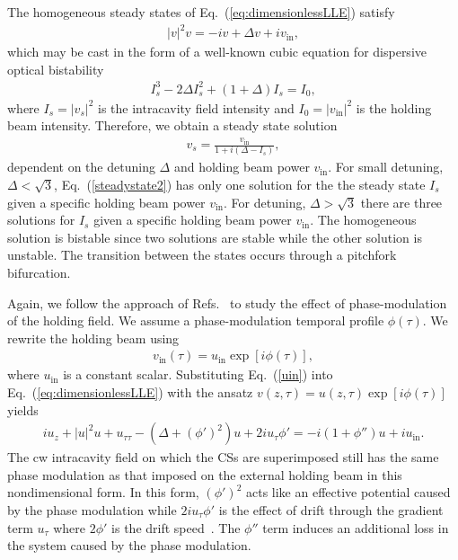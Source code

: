 The homogeneous steady states of Eq.~(\ref{eq:dimensionlessLLE}) satisfy 
\begin{align}
|v|^2 v = -i v + \Delta v+ i v_{\mathrm{in}}, 
\label{steadyStateNLS}
\end{align}
which may be cast in the form of a well-known cubic equation for dispersive optical bistability~\cite{Grelu,LL,info2,Gomila2007}
\begin{align}
I_s^3 - 2\Delta I_s^2 + (1+ \Delta) I_s = I_0,
\label{steadystate2}
\end{align}
where $I_s = |v_s|^2$ is the intracavity field intensity and $I_0 = |v_{\mathrm{in}}|^2$ is the holding beam intensity.  Therefore, we obtain a steady state solution
\begin{align}
v_s = \frac{v_{\mathrm{in}}}{1+ i (\Delta - I_s)},
\end{align}
dependent on the detuning $\Delta$ and holding beam power $v_{\mathrm{in}}$.  For small detuning, $\Delta < \sqrt{3}$, Eq.~(\ref{steadystate2}) has only one solution for the the steady state $I_s$ given a specific holding beam power $v_{\mathrm{in}}$.  For detuning, $\Delta > \sqrt{3}$ there are three solutions for $I_s$ given a specific holding beam power $v_{\mathrm{in}}$.  The homogeneous solution is bistable since two solutions are stable while the other solution is unstable.  The transition between the states occurs through a pitchfork bifurcation.

Again, we follow the approach of Refs.~\cite{tweeze,firth96} to study the effect of phase-modulation of the holding field.  We assume a phase-modulation temporal profile $\phi(\tau)$.  We rewrite the holding beam using  
\begin{align}
v_{\mathrm{in}} (\tau) = u_{\mathrm{in}} \exp[i \phi(\tau)], \label{uin}
\end{align}
where $u_{\mathrm{in}}$ is a constant scalar.  Substituting Eq.~(\ref{uin}) into Eq.~(\ref{eq:dimensionlessLLE}) with the ansatz $v(z, \tau) = u(z, \tau) \exp[i \phi(\tau)]$ yields 
\begin{align}
i u_z + |u|^2 u + u_{\tau\tau} - (\Delta + (\phi')^2) u + 2i u_{\tau} \phi' = - i (1+\phi'') u + i u_{\mathrm{in}}.
\label{eq:LLETweeze}
\end{align}
The cw intracavity field on which the CSs are superimposed still has the same phase modulation as that imposed on the external holding beam in this nondimensional form.  In this form, $(\phi')^2$ acts like an effective potential caused by the phase modulation while $ 2i u_{\tau} \phi'$ is the effect of drift through the gradient term $u_{\tau}$ where $2 \phi'$ is the drift speed~\cite{ParraRivas2014}.  The $\phi''$ term induces an additional loss in the system caused by the phase modulation.

